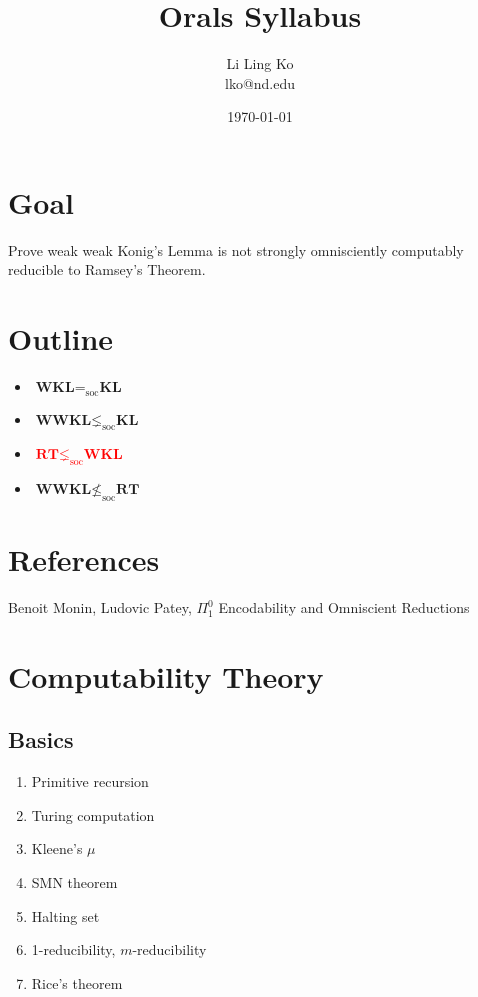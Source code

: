 \documentclass{article}
\newcommand{\MAYBE}[1]{\textcolor{red}{#1}}
\begin{document}
\title{Orals Syllabus}
\author{Li Ling Ko\\ lko@nd.edu}
\date{\today}
\maketitle

\section{Goal}
Prove weak weak Konig's Lemma is not strongly omnisciently computably
reducible to Ramsey's Theorem.

\section{Outline}
\begin{itemize}
  \item $\textbf{WKL} =_{\text{soc}} \textbf{KL}$
  \item $\textbf{WWKL} \lneq_{\text{soc}} \textbf{KL}$
  \item \MAYBE{$\textbf{RT} \lneq_{\text{soc}} \textbf{WKL}$}
  \item $\textbf{WWKL} \nleq_{\text{soc}} \textbf{RT}$
\end{itemize}

\section{References}
Benoit Monin, Ludovic Patey, $\Pi_1^0$ Encodability and Omniscient
Reductions

\section{Computability Theory}
\subsection{Basics}
\begin{enumerate}
  \item Primitive recursion
  \item Turing computation
  \item Kleene's $\mu$
  \item SMN theorem
  \item Halting set
  \item 1-reducibility, $m$-reducibility
  \item Rice's theorem
\end{enumerate}
\end{document}

